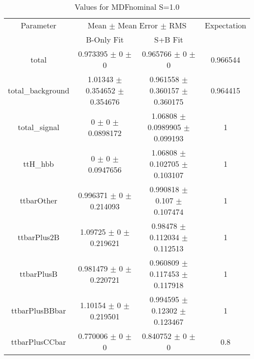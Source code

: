 \begin{table}
\centering
\caption{Values for MDFnominal S=1.0}
\begin{tabular}{cccc}
\toprule
Parameter & \multicolumn{2}{c}{Mean $\pm$ Mean Error $\pm$ RMS} & Expectation\\
 & B-Only Fit & S+B Fit & \\
\midrule
total & \num{0.973395} $\pm$ \num{0} $\pm$ \num{0} & \num{0.965766} $\pm$ \num{0} $\pm$ \num{0} & \num{0.966544}\\
total\_background & \num{1.01343} $\pm$ \num{0.354652} $\pm$ \num{0.354676} & \num{0.961558} $\pm$ \num{0.360157} $\pm$ \num{0.360175} & \num{0.964415}\\
total\_signal & \num{0} $\pm$ \num{0} $\pm$ \num{0.0898172} & \num{1.06808} $\pm$ \num{0.0989905} $\pm$ \num{0.099193} & \num{1}\\
ttH\_hbb & \num{0} $\pm$ \num{0} $\pm$ \num{0.0947656} & \num{1.06808} $\pm$ \num{0.102705} $\pm$ \num{0.103107} & \num{1}\\
ttbarOther & \num{0.996371} $\pm$ \num{0} $\pm$ \num{0.214093} & \num{0.990818} $\pm$ \num{0.107} $\pm$ \num{0.107474} & \num{1}\\
ttbarPlus2B & \num{1.09725} $\pm$ \num{0} $\pm$ \num{0.219621} & \num{0.98478} $\pm$ \num{0.112034} $\pm$ \num{0.112513} & \num{1}\\
ttbarPlusB & \num{0.981479} $\pm$ \num{0} $\pm$ \num{0.220721} & \num{0.960809} $\pm$ \num{0.117453} $\pm$ \num{0.117918} & \num{1}\\
ttbarPlusBBbar & \num{1.10154} $\pm$ \num{0} $\pm$ \num{0.219501} & \num{0.994595} $\pm$ \num{0.12302} $\pm$ \num{0.123467} & \num{1}\\
ttbarPlusCCbar & \num{0.770006} $\pm$ \num{0} $\pm$ \num{0} & \num{0.840752} $\pm$ \num{0} $\pm$ \num{0} & \num{0.8}\\
\bottomrule
\end{tabular}
\end{table}